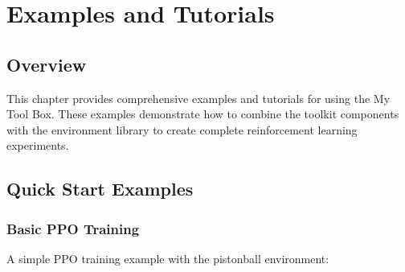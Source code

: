 \chapter{Examples and Tutorials}

\section{Overview}

This chapter provides comprehensive examples and tutorials for using the My Tool Box. These examples demonstrate how to combine the toolkit components with the environment library to create complete reinforcement learning experiments.

\section{Quick Start Examples}

\subsection{Basic PPO Training}

A simple PPO training example with the pistonball environment:

